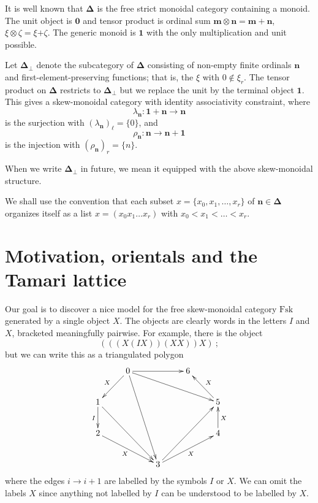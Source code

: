 \documentclass[a4paper,12pt,reqno]{amsart}
\theoremstyle{definition}
\theoremstyle{fact}
\theoremstyle{genquest}
\theoremstyle{step}
\newcommand{\lra}{\longrightarrow}
\begin{document}
It is well known \cite{osed} that $\mathbf{\Delta}$ is the free strict monoidal category containing a monoid.
The unit object is $\mathbf{0}$ and tensor product is ordinal sum $\mathbf{m}\otimes \mathbf{n} = \mathbf{m+n}$, $\xi\otimes \zeta = \xi \mathbf{+} \zeta$.
The generic monoid is $\mathbf{1}$ with the only multiplication and unit possible.

Let $\mathbf{\Delta}_{\bot}$ denote the subcategory of $\mathbf{\Delta}$ consisting of non-empty finite ordinals $\mathbf{n}$
and first-element-preserving functions; that is, the $\xi$ with $0\notin \xi_r$.
The tensor product on 
$\mathbf{\Delta}$ restricts to $\mathbf{\Delta}_{\bot}$ 
but we replace the unit by the terminal object $\mathbf{1}$.
This gives a skew-monoidal category with identity associativity constraint, where 
$$\lambda_{\mathbf{n}} : \mathbf{1+n} \lra \mathbf{n}$$ is the surjection with 
$(\lambda_{\mathbf{n}})_{\ell} = \{0\}$, and 
$$\rho_{\mathbf{n}} : \mathbf{n} \lra \mathbf{n+1}$$ is the injection with
$(\rho_{\mathbf{n}})_{r} = \{n\}$.

When we write $\mathbf{\Delta}_{\bot}$ in future, we mean it equipped with the above skew-monoidal structure. 

We shall use the convention that each subset $x=\{x_0,x_1, \dots ,x_r\}$ of $\mathbf{n}\in \mathbf{\Delta}$ organizes itself as a list $x=(x_0x_1\dots x_r)$ with $x_0<x_1< \dots <x_r$.  

\section{Motivation, orientals and the Tamari lattice}

Our goal is to discover a nice model for the free skew-monoidal category $\mathrm{Fsk}$ generated by a single object $X$. 
The objects are clearly words in the letters $I$ and $X$, bracketed meaningfully pairwise. 
For example, there is the object 
\begin{equation}
(((X(IX))(XX))X) \ ;
\end{equation}
but we can write this as a triangulated polygon
\begin{equation}\label{hexagon1}
\xymatrix{
& 0 \ar[rr]{} \ar[rrrd]{} \ar[rddd]{}  \ar[ld]_{X}  & & 6  &  \\
1 \ar[rrdd]{} \ar[d]_{I} & & & & 5 \ar[lu]_{X} \\
2  \ar[rrd]_{X} & & & & 4  \ar[u]_{X} \\
& &  3 \ar[rruu]{}  \ar[rru]_{X} &
}
\end{equation}
where the edges $i\lra i+1$ are labelled by the symbols $I$ or $X$.
We can omit the labels $X$ since anything not labelled by $I$ can be understood to be labelled by $X$.
\end{document}
